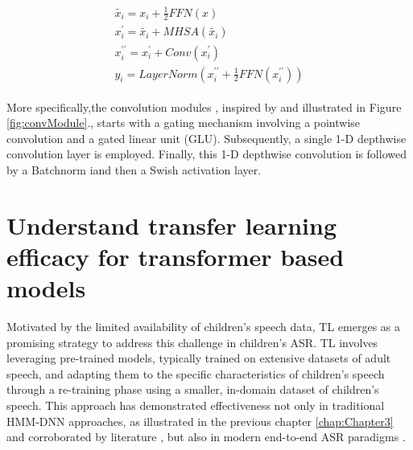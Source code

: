 \begin{align}
    \begin{split}
    \tilde{x_i} = x_i + \frac{1}{2}FFN(x) \\
    x_i^{\prime} =\tilde{x_i} + MHSA(\tilde{x_i}) \\
    x_i^{\prime\prime} = x_i^{\prime} + Conv(x_i^{\prime}) \\
    y_i = LayerNorm(x_i^{\prime\prime} + \frac{1}{2}FFN(x_i^{\prime\prime}))
    \end{split}
\end{align}

More specifically,the convolution modules , inspired by \cite{wu2020lite} and illustrated in Figure \ref{fig:convModule}., starts with a gating mechanism \cite{dauphin2017language} involving a pointwise convolution and a gated linear unit (GLU). Subsequently, a single 1-D depthwise convolution layer is employed. Finally, this 1-D depthwise convolution is followed by a Batchnorm iand then a Swish activation layer.


\section{Understand transfer learning efficacy for transformer based models}
Motivated by the limited availability of children's speech data, TL emerges as a promising strategy to address this challenge in children's ASR. TL involves leveraging pre-trained models, typically trained on extensive datasets of adult speech, and adapting them to the specific characteristics of children's speech through a re-training phase using a smaller, in-domain dataset of children's speech. This approach has demonstrated effectiveness not only in traditional HMM-DNN approaches, as illustrated in the previous chapter \ref{chap:Chapter3} and corroborated by literature \cite{shivakumar2020transfer}, but also in modern end-to-end ASR paradigms \cite{sri_end2end,gelin2021endtoend}.

